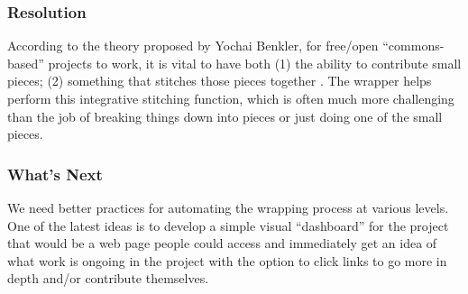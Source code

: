 \subsubsection*{Resolution} 
According to the theory proposed by Yochai Benkler, for free/open ``commons-based'' projects to work, it is vital to have both (1) the ability to contribute small pieces; (2) something that stitches those pieces together \cite{coases-penguin}. The wrapper helps perform this integrative stitching function, which is often much more challenging than the job of breaking things down into pieces or just doing one of the small pieces.

\subsubsection*{What's Next}
We need better practices for automating the wrapping process at various levels. One of the latest ideas is to develop a simple visual ``dashboard'' for the project that would be a web page people could access and immediately get an idea of what work is ongoing in the project with the option to click links to go more in depth and/or contribute themselves.


